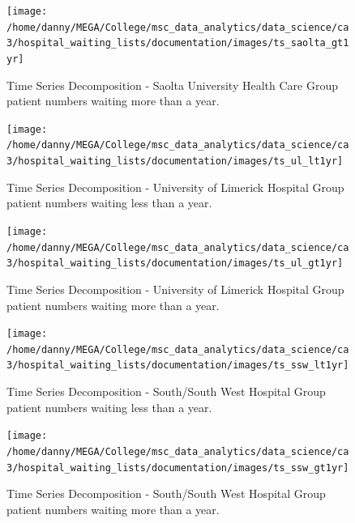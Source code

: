 \documentclass[
  12pt,
]{article}
\begin{document}
\begin{figure}

{\centering \texttt{[image: /home/danny/MEGA/College/msc\_data\_analytics/data\_science/ca3/hospital\_waiting\_lists/documentation/images/ts\_saolta\_gt1yr]} 

}

\caption{Time Series Decomposition - Saolta University Health Care Group patient numbers waiting more than a year.}\label{fig:ts-saolta-gt1yr}
\end{figure}

\begin{figure}

{\centering \texttt{[image: /home/danny/MEGA/College/msc\_data\_analytics/data\_science/ca3/hospital\_waiting\_lists/documentation/images/ts\_ul\_lt1yr]} 

}

\caption{Time Series Decomposition - University of Limerick Hospital Group patient numbers waiting less than a year.}\label{fig:ts-ul-lt1yr}
\end{figure}

\begin{figure}

{\centering \texttt{[image: /home/danny/MEGA/College/msc\_data\_analytics/data\_science/ca3/hospital\_waiting\_lists/documentation/images/ts\_ul\_gt1yr]} 

}

\caption{Time Series Decomposition - University of Limerick Hospital Group patient numbers waiting more than a year.}\label{fig:ts-ul-gt1yr}
\end{figure}

\begin{figure}

{\centering \texttt{[image: /home/danny/MEGA/College/msc\_data\_analytics/data\_science/ca3/hospital\_waiting\_lists/documentation/images/ts\_ssw\_lt1yr]} 

}

\caption{Time Series Decomposition - South/South West Hospital Group patient numbers waiting less than a year.}\label{fig:ts-ssw-lt1yr}
\end{figure}

\begin{figure}

{\centering \texttt{[image: /home/danny/MEGA/College/msc\_data\_analytics/data\_science/ca3/hospital\_waiting\_lists/documentation/images/ts\_ssw\_gt1yr]} 

}

\caption{Time Series Decomposition - South/South West Hospital Group patient numbers waiting more than a year.}\label{fig:ts-ssw-gt1yr}
\end{figure}
\end{document}
